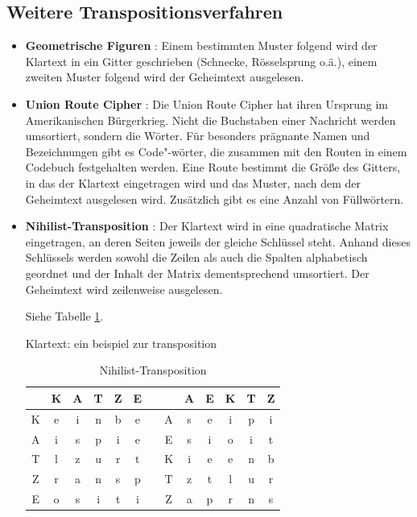 \begin{refsegment}
\subsection{Weitere Transpositionsverfahren}

\begin{itemize}

\item \textbf{Geometrische Figuren} \cite{Goebel2014}: Einem bestimmten Muster
   folgend wird der Klartext in ein Gitter geschrieben (Schnecke, Rösselsprung
   o.ä.), einem zweiten Muster folgend wird der Geheimtext ausgelesen.

\item \textbf{Union Route Cipher} \cite{Goebel2014}: Die Union Route Cipher hat
   ihren Ursprung im Amerikanischen Bürgerkrieg. Nicht die Buchstaben einer
   Nachricht werden umsortiert, sondern die Wörter. Für besonders prägnante
   Namen und Bezeichnungen gibt es Code"-wörter, die zusammen mit den Routen
   in einem Codebuch festgehalten werden. Eine Route bestimmt die Größe des
   Gitters, in das der Klartext eingetragen wird und das Muster, nach dem der
   Geheimtext ausgelesen wird. Zusätzlich gibt es eine Anzahl von
   Füllwörtern.

\item \textbf{Nihilist-Transposition} \cite{ACA2002}%
   :
   Der Klartext wird in eine
   quadratische Matrix eingetragen, an deren Seiten jeweils der gleiche
   Schlüssel steht. Anhand dieses Schlüssels werden sowohl die Zeilen als
   auch die Spalten alphabetisch geordnet und der Inhalt der Matrix
   dementsprechend umsortiert. Der Geheimtext wird zeilenweise ausgelesen.

   Siehe Tabelle \ref{PaP_NihilistTransp_table-reference}.

   Klartext: ein beispiel zur transposition

   \begin{table}[ht]
   \begin{center}
   \begin{tabular}{|c|ccccc||cc|ccccc|}
   \hline
	  & K & A & T & Z & E &   &   & A & E & K & T & Z\\
   \hline
	K & e & i & n & b & e &   & A & s & e & i & p & i\\
	A & i & s & p & i & e &   & E & s & i & o & i & t\\
	T & l & z & u & r & t &   & K & i & e & e & n & b\\
	Z & r & a & n & s & p &   & T & z & t & l & u & r\\
	E & o & s & i & t & i &   & Z & a & p & r & n & s\\
   \hline
   \end{tabular}
   \caption[Nihilist-Transposition]{Nihilist-Transposition\footnotemark}
   \label{PaP_NihilistTransp_table-reference}
   \end{center}
   \end{table}


\end{itemize}
\end{refsegment}
